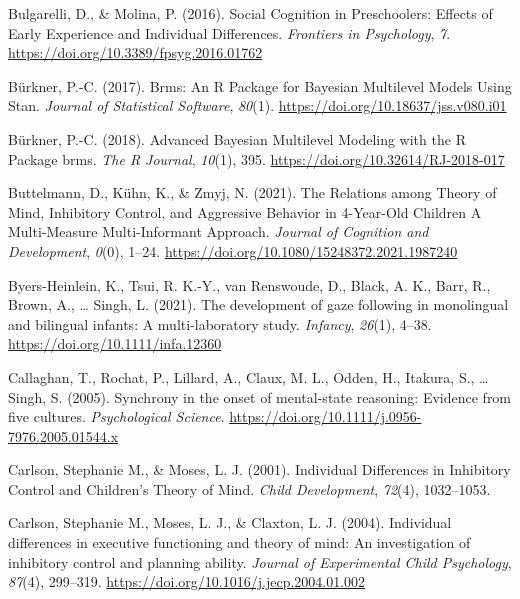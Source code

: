 \documentclass[
  man,floatsintext]{apa6}
\newlength{\cslhangindent}
\newlength{\cslentryspacingunit} %
\newenvironment{CSLReferences}[2] %
 {%
  \setlength{\parindent}{0pt}
  \ifodd #1
  \let\oldpar\par
  \def\par{\hangindent=\cslhangindent\oldpar}
  \fi
  \setlength{\parskip}{#2\cslentryspacingunit}
 }%
 {}
\begin{document}
\begin{CSLReferences}{1}{0}
\leavevmode{}%
Bulgarelli, D., \& Molina, P. (2016). Social {Cognition} in {Preschoolers}: {Effects} of {Early Experience} and {Individual Differences}. \emph{Frontiers in Psychology}, \emph{7}. \url{https://doi.org/10.3389/fpsyg.2016.01762}

\leavevmode{}%
Bürkner, P.-C. (2017). Brms: {An R Package} for {Bayesian Multilevel Models Using Stan}. \emph{Journal of Statistical Software}, \emph{80}(1). \url{https://doi.org/10.18637/jss.v080.i01}

\leavevmode{}%
Bürkner, P.-C. (2018). Advanced {Bayesian Multilevel Modeling} with the {R Package} brms. \emph{The R Journal}, \emph{10}(1), 395. \url{https://doi.org/10.32614/RJ-2018-017}

\leavevmode{}%
Buttelmann, D., Kühn, K., \& Zmyj, N. (2021). The {Relations} among {Theory} of {Mind}, {Inhibitory Control}, and {Aggressive Behavior} in 4-{Year-Old Children} \textendash{} {A Multi-Measure Multi-Informant Approach}. \emph{Journal of Cognition and Development}, \emph{0}(0), 1--24. \url{https://doi.org/10.1080/15248372.2021.1987240}

\leavevmode{}%
Byers-Heinlein, K., Tsui, R. K.-Y., van Renswoude, D., Black, A. K., Barr, R., Brown, A., \ldots{} Singh, L. (2021). The development of gaze following in monolingual and bilingual infants: {A} multi-laboratory study. \emph{Infancy}, \emph{26}(1), 4--38. \url{https://doi.org/10.1111/infa.12360}

\leavevmode{}%
Callaghan, T., Rochat, P., Lillard, A., Claux, M. L., Odden, H., Itakura, S., \ldots{} Singh, S. (2005). Synchrony in the onset of mental-state reasoning: {Evidence} from five cultures. \emph{Psychological Science}. \url{https://doi.org/10.1111/j.0956-7976.2005.01544.x}

\leavevmode{}%
Carlson, Stephanie M., \& Moses, L. J. (2001). Individual {Differences} in {Inhibitory Control} and {Children}'s {Theory} of {Mind}. \emph{Child Development}, \emph{72}(4), 1032--1053.

\leavevmode{}%
Carlson, Stephanie M., Moses, L. J., \& Claxton, L. J. (2004). Individual differences in executive functioning and theory of mind: {An} investigation of inhibitory control and planning ability. \emph{Journal of Experimental Child Psychology}, \emph{87}(4), 299--319. \url{https://doi.org/10.1016/j.jecp.2004.01.002}


\end{CSLReferences}
\end{document}
